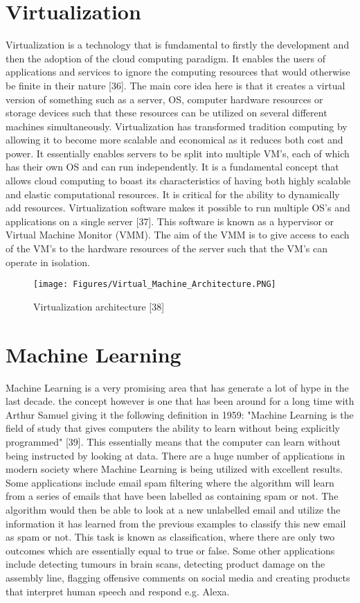 \documentclass[oneside,12pt]{Classes/RoboticsLaTeX}
\begin{document}
\section{Virtualization}
Virtualization is a technology that is fundamental to firstly the development and then the adoption of the cloud computing paradigm. It enables the users of applications and services to ignore the computing resources that would otherwise be finite in their nature [36]. The main core idea here is that it creates a virtual version of something such as a server, OS, computer hardware resources or storage devices such that these resources can be utilized on several different machines simultaneously. Virtualization has transformed tradition computing by allowing it to become more scalable and economical as it reduces both cost and power. It essentially enables servers to be split into multiple VM's, each of which has their own OS and can run independently. It is a fundamental concept that allows cloud computing to boast its characteristics of having both highly scalable and elastic computational resources. It is critical for the ability to dynamically add resources. Virtualization software makes it possible to run multiple OS's and applications on a single server [37]. This software is known as a hypervisor or Virtual Machine Monitor (VMM). The aim of the VMM is to give access to each of the VM's to the hardware resources of the server such that the VM's can operate in isolation.  

\begin{figure}[h]
\centering
\texttt{[image: Figures/Virtual\_Machine\_Architecture.PNG]}
\caption{Virtualization architecture [38]}
\end{figure}



\section{Machine Learning}
Machine Learning is a very promising area that has generate a lot of hype in the last decade. the concept however is one that has been around for a long time with Arthur Samuel giving it the following definition in 1959: "Machine Learning is the field of study that gives computers the ability to learn without being explicitly programmed" [39]. This essentially means that the computer can learn without being instructed by looking at data. There are a huge number of applications in modern society where Machine Learning is being utilized with excellent results. Some applications include email spam filtering where the algorithm will learn from a series of emails that have been labelled as containing spam or not. The algorithm would then be able to look at a new unlabelled email and utilize the information it has learned from the previous examples to classify this new email as spam or not. This task is known as classification, where there are only two outcomes which are essentially equal to true or false. Some other applications include detecting tumours in brain scans, detecting product damage on the assembly line, flagging offensive comments on social media and creating products that interpret human speech and respond e.g. Alexa. 
\end{document}
